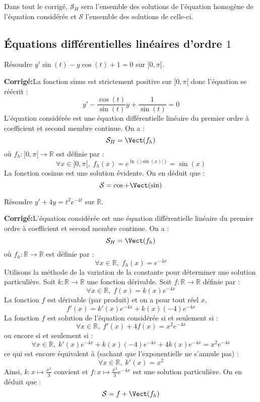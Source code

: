 \documentclass[a4paper,twoside,french,11pt]{VcCours}
\newcommand{\corr}{\textbf{Corrigé:}}
\begin{document}

\tableofcontents
\separationTitre


Dans tout le corrigé, $\mathcal{S}_H$ sera l'ensemble des solutions de l'équation homogène de l'équation considérée et $\mathcal{S}$ l'ensemble des solutions de celle-ci.



\subsection{Équations différentielles linéaires d'ordre \texorpdfstring{$1$}{1}}


\begin{Exercice}{} Résoudre $y' \sin(t)-y \cos(t)+1=0$ sur $]0,\pi[$.
\end{Exercice}

\corr La fonction sinus est strictement positive sur $]0, \pi[$ donc l'équation se réécrit :
$$ y' - \dfrac{\cos(t)}{\sin(t)} y + \dfrac{1}{\sin(t)} = 0$$
L'équation considérée est une équation différentielle linéaire du premier ordre à coefficient et second membre continue. On a :
$$ \mathcal{S}_H = \Vect(f_h)$$
où $f_h : ]0, \pi[ \rightarrow \mathbb{R}$ est définie par :
$$ \forall x \in ]0, \pi[, \; f_h(x) = e^{ \ln( \vert \sin(x) \vert)} = \sin(x)$$
La fonction cosinus est une solution évidente. On en déduit que :
$$ \mathcal{S} = \cos +  \Vect(\sin)$$

\begin{Exercice}{} Résoudre $y'+4y = t^2 e^{-4t}$ sur $\mathbb{R}$. 
\end{Exercice}

\corr L'équation considérée est une équation différentielle linéaire du premier ordre à coefficient et second membre continue. On a :
$$ \mathcal{S}_H = \Vect(f_h)$$
où $f_h : \mathbb{R} \rightarrow \mathbb{R}$ est définie par :
$$ \forall x \in \mathbb{R}, \; f_h(x) = e^{-4x}$$
Utilisons la méthode de la variation de la constante pour déterminer une solution particulière. Soit $k : \mathbb{R} \rightarrow \mathbb{R}$ une fonction dérivable. Soit $f : \mathbb{R} \rightarrow \mathbb{R}$ définie par :
$$ \forall x \in \mathbb{R}, \; f(x) = k(x) e^{-4x}$$
La fonction $f$ est dérivable (par produit) et on a pour tout réel $x$,
$$ f'(x) = k'(x) e^{-4x} + k(x)(-4)e^{-4x}$$
La fonction $f$ est solution de l'équation considérée si et seulement si :
$$ \forall x \in \mathbb{R}, \; f'(x)+4f(x) = x^2 e^{-4x}$$
ou encore si et seulement si :
$$ \forall x \in \mathbb{R}, \; k'(x) e^{-4x} + k(x)(-4)e^{-4x} + 4k(x) e^{-4x} = x^2 e^{-4x}$$
ce qui est encore équivalent à (sachant que l'exponentielle ne s'annule pas) :
$$ \forall x \in \mathbb{R}, \; k'(x) = x^2$$
Ainsi, $k : x \mapsto \tfrac{x^3}{3}$ convient et $f : x \mapsto \tfrac{x^3}{3} e^{-4x}$ est une solution particulière. On en déduit que :
$$ \mathcal{S} = f +  \Vect(f_h)$$
\end{document}
